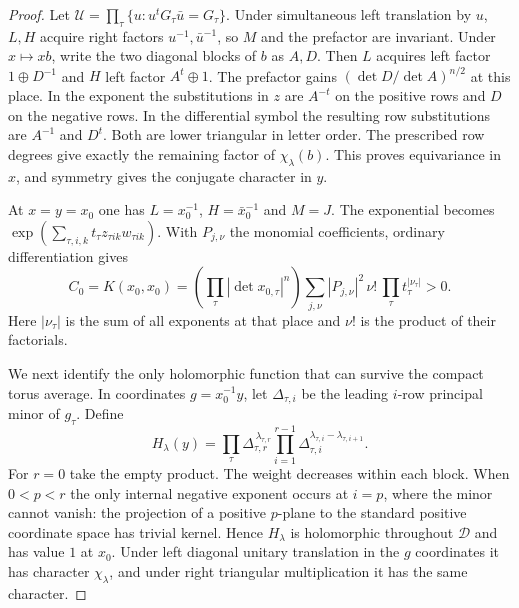 \begin{proof}
Let $\mathcal U=\prod_\tau\{u:u^tG_\tau\bar u=G_\tau\}$. Under
simultaneous left translation by $u$, $L,H$ acquire right factors
$u^{-1},\bar u^{-1}$, so $M$ and the prefactor are invariant.
Under $x\mapsto xb$, write the two diagonal blocks of $b$ as $A,D$.
Then $L$ acquires left factor $1\oplus D^{-1}$ and $H$ left factor
$A^t\oplus1$. The prefactor gains $(\det D/\det A)^{n/2}$ at this
place. In the exponent the substitutions in $z$ are $A^{-t}$ on
the positive rows and $D$ on the negative rows. In the differential
symbol the resulting row substitutions are $A^{-1}$ and $D^t$.
Both are lower triangular in letter order. The prescribed row
degrees give exactly the remaining factor of $\chi_\lambda(b)$.
This proves equivariance in $x$, and symmetry gives the conjugate
character in $y$.

At $x=y=x_0$ one has $L=x_0^{-1}$, $H=\bar x_0^{-1}$ and $M=J$.
The exponential becomes $\exp(\sum_{\tau,i,k}t_\tau z_{\tau ik}
w_{\tau ik})$. With $P_{j,\nu}$ the monomial coefficients, ordinary
differentiation gives
\[
 C_0=K(x_0,x_0)=
   \left(\prod_\tau|\det x_{0,\tau}|^n\right)
   \sum_{j,\nu}|P_{j,\nu}|^2\,\nu!\,
                       \prod_\tau t_\tau^{|\nu_\tau|}>0 .
\]
Here $|\nu_\tau|$ is the sum of all exponents at that place and
$\nu!$ is the product of their factorials.

We next identify the only holomorphic function that can survive
the compact torus average. In coordinates $g=x_0^{-1}y$, let
$\Delta_{\tau,i}$ be the leading $i$-row principal minor of $g_\tau$.
Define
\[
 H_\lambda(y)=\prod_\tau
    \Delta_{\tau,r}^{\,\lambda_{\tau,r}}
    \prod_{i=1}^{r-1}\Delta_{\tau,i}^{
                              \lambda_{\tau,i}-\lambda_{\tau,i+1}} .
\]
For $r=0$ take the empty product. The weight decreases within each
block. When $0<p<r$ the only internal negative exponent occurs at
$i=p$, where the minor cannot vanish: the projection of a positive
$p$-plane to the standard positive coordinate space has trivial
kernel. Hence $H_\lambda$ is holomorphic throughout $\mathcal D$ and
has value $1$ at $x_0$. Under left diagonal unitary translation in
the $g$ coordinates it has character $\chi_\lambda$, and under right
triangular multiplication it has the same character.


\end{proof}
